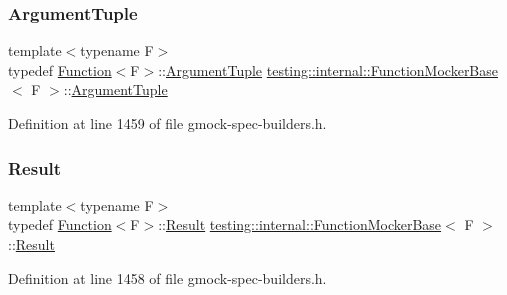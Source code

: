 \subsubsection{\texorpdfstring{Argument\+Tuple}{ArgumentTuple}}
{\footnotesize\ttfamily template$<$typename F$>$ \\
typedef \hyperlink{structtesting_1_1internal_1_1Function}{Function}$<$F$>$\+::\hyperlink{classtesting_1_1internal_1_1FunctionMockerBase_a336432a07e544af4ffb8103603471ca3}{Argument\+Tuple} \hyperlink{classtesting_1_1internal_1_1FunctionMockerBase}{testing\+::internal\+::\+Function\+Mocker\+Base}$<$ F $>$\+::\hyperlink{classtesting_1_1internal_1_1FunctionMockerBase_a336432a07e544af4ffb8103603471ca3}{Argument\+Tuple}}



Definition at line 1459 of file gmock-\/spec-\/builders.\+h.

\mbox{\label{classtesting_1_1internal_1_1FunctionMockerBase_aa50abc4055b4d3a14ad64c317bccec8d}} 
\subsubsection{\texorpdfstring{Result}{Result}}
{\footnotesize\ttfamily template$<$typename F$>$ \\
typedef \hyperlink{structtesting_1_1internal_1_1Function}{Function}$<$F$>$\+::\hyperlink{classtesting_1_1internal_1_1FunctionMockerBase_aa50abc4055b4d3a14ad64c317bccec8d}{Result} \hyperlink{classtesting_1_1internal_1_1FunctionMockerBase}{testing\+::internal\+::\+Function\+Mocker\+Base}$<$ F $>$\+::\hyperlink{classtesting_1_1internal_1_1FunctionMockerBase_aa50abc4055b4d3a14ad64c317bccec8d}{Result}}



Definition at line 1458 of file gmock-\/spec-\/builders.\+h.

\mbox{\label{classtesting_1_1internal_1_1FunctionMockerBase_aa4e1b2ee217676c9e70c3006b19a8074}} 
